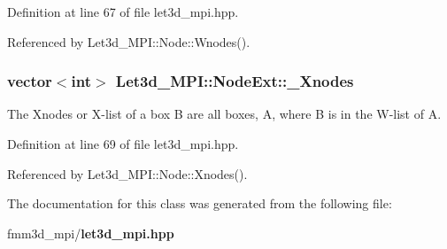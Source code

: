 Definition at line 67 of file let3d\_\-mpi.hpp.

Referenced by Let3d\_\-MPI::Node::Wnodes().
\subsubsection{\setlength{\rightskip}{0pt plus 5cm}vector$<$int$>$ {\bf Let3d\_\-MPI::Node\-Ext::\_\-Xnodes}}\label{classLet3d__MPI_1_1NodeExt_5043fab0978cb1ebf36e5be3708c1919_5043fab0978cb1ebf36e5be3708c1919}


The Xnodes or X-list of a box B are all boxes, A, where B is in the W-list of A. 

Definition at line 69 of file let3d\_\-mpi.hpp.

Referenced by Let3d\_\-MPI::Node::Xnodes().

The documentation for this class was generated from the following file:\begin{CompactItemize}
\item 
fmm3d\_\-mpi/{\bf let3d\_\-mpi.hpp}\end{CompactItemize}
